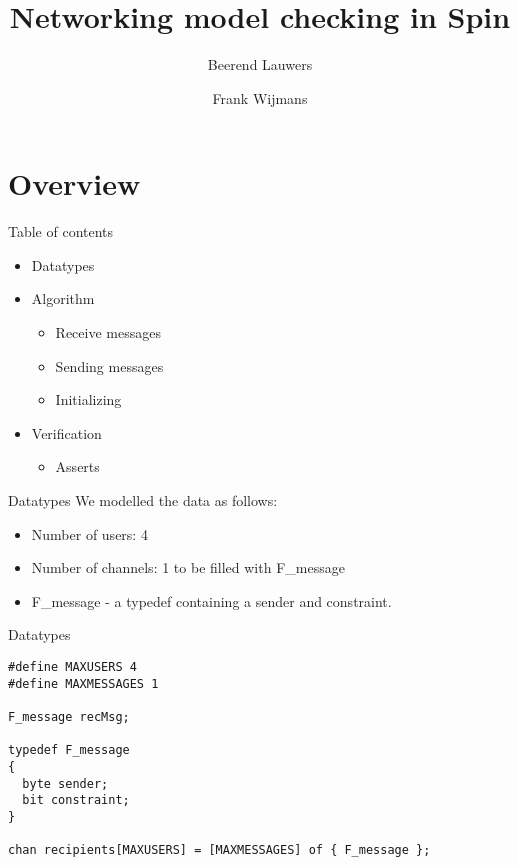 \documentclass[10pt]{beamer}
\author{Beerend Lauwers \and Frank Wijmans}
\title{Networking model checking in Spin}
\begin{document}
	\maketitle
	
	\section{Overview} 
	
	\begin{frame}{Table of contents}
		\begin{itemize}
			\item Datatypes
			\item Algorithm
			\begin{itemize}
				\item Receive messages
				\item Sending messages
				\item Initializing
			\end{itemize}
			\item Verification
			\begin{itemize}
				\item Asserts
			\end{itemize}
		\end{itemize}
	\end{frame}
	
	\begin{frame}{Datatypes}
		We modelled the data as follows:
		\begin{itemize}
			\item Number of users: 4
			\item Number of channels: 1 to be filled with F\_message
			\item F\_message - a typedef containing a sender and constraint.
		\end{itemize}
		
	\end{frame}
	
	\begin{frame}[fragile]{Datatypes}
		\begin{lstlisting}
#define MAXUSERS 4
#define MAXMESSAGES 1

F_message recMsg;

typedef F_message
{
  byte sender;
  bit constraint;
}

chan recipients[MAXUSERS] = [MAXMESSAGES] of { F_message };

		\end{lstlisting}
	\end{frame}
	
\end{document}
